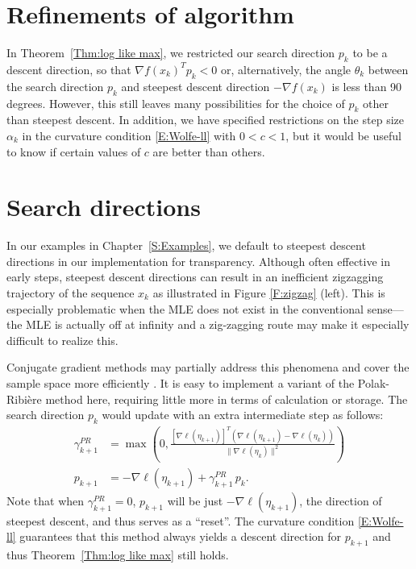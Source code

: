 \section{Refinements of algorithm}

In Theorem~\ref{Thm:log like max}, we restricted our search direction $p_k$ to be a 
descent direction, so that $\nabla f
(x_k)^T p_k < 0$ or, alternatively, the angle $\theta_k$ between the search direction 
$p_k$ and steepest descent 
direction $-\nabla f(x_k)$ is less than 90 degrees.  However, this still leaves many 
possibilities for the choice of 
$p_k$ other than steepest descent.  In addition, we have specified restrictions on the 
step size $\alpha_k$ in the 
curvature condition \eqref{E:Wolfe-ll} with $0 < c < 1$, but it would be useful to 
know if certain values of $c$ are 
better than others.

\section{Search directions} \label{S:Search directions}
In our examples in Chapter~\ref{S:Examples}, we default to steepest descent directions 
in our implementation for 
transparency.  Although often effective in early steps, steepest descent directions 
can result in an inefficient zigzagging 
trajectory of the sequence $x_k$ \citep{Sun:2006}  as 
illustrated in Figure 
\ref{F:zigzag} (left).  This is especially problematic when the MLE does not exist in the 
conventional sense---the MLE is actually off at infinity and a zig-zagging route may 
make it especially difficult to realize this.

Conjugate gradient methods may partially address 
this phenomena and cover the 
sample space more efficiently \citep{NW}.  It is easy to implement a variant of the 
Polak-Ribi\`{e}re method
\citep[pp.~120--122]{NW} here, requiring little more in terms of calculation or 
storage.  The search direction $p_k$ would update 
with an extra intermediate step as follows:
\begin{align*}
	\gamma_{k+1}^{PR} &= \max \left( 0, \frac{ [ \nabla \ell( \eta_{k+1}) ]^T( \nabla \ell( \eta_{k+1} ) - \nabla \ell( \eta_k) )  }
{ \lVert \nabla \ell( \eta_k) \rVert^2 } \right )\\
	p_{k+1} &= -\nabla \ell( \eta_{k+1}) + \gamma_{k+1}^{PR} \, p_k.
\end{align*}
Note that when $\gamma_{k+1}^{PR} = 0$, $p_{k+1}$ will be just $-\nabla \ell( \eta_{k+1})$, 
the direction of steepest 
descent, and thus serves as a ``reset''.  The curvature condition \eqref{E:Wolfe-ll} 
guarantees that this method always 
yields a descent direction for $p_{k+1}$ and thus Theorem~\ref{Thm:log like max} still 
holds.  


